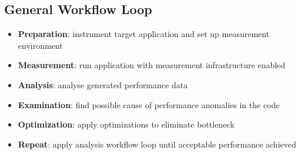 \begin{minipage}[c]{.72\columnwidth}
\subsection{General Workflow Loop}

\vspace{1em}
\begin{itemize}
\itemsep0.1em
\item \textbf{Preparation}: instrument target application and set up measurement environment
\item \textbf{Measurement}: run application with measurement infrastructure enabled
\item \textbf{Analysis}: analyse generated performance data
\item \textbf{Examination}: find possible cause of performance anomalies in the code
\item \textbf{Optimization}: apply optimizations to eliminate bottleneck
\item \textbf{Repeat}: apply analysis workflow loop until acceptable performance achieved
\end{itemize}
\end{minipage}
\hspace{.05\columnwidth}
